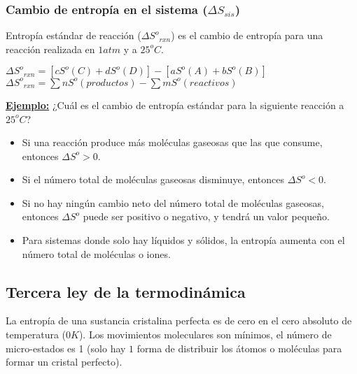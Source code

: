         \subsubsection{Cambio de entropía en el sistema ($\Delta S_{sis}$)}
        \sangria{} Entropía estándar de reacción ($\Delta {S^o}_{rxn}$) es el cambio de entropía para una reacción realizada en $1atm$ y a $25^oC$.
        \begin{center}
            $\Delta {S^o}_{rxn} = [cS^o(C) + dS^o(D)] - [aS^o(A) + bS^o(B)]$ \\[5pt]
            $\Delta {S^o}_{rxn} = \sum n S^o(productos) - \sum m S^o(reactivos)$
        \end{center}
        \textbf{\underline{Ejemplo:}} ¿Cuál es el cambio de entropía estándar para la siguiente reacción a $25^oC$? 
        
        \begin{itemize}
            \item Si una reacción produce más moléculas gaseosas que las que consume, entonces $\Delta S^o > 0$.
            \item Si el número total de moléculas gaseosas disminuye, entonces $\Delta S^o < 0$.
            \item Si no hay ningún cambio neto del número total de moléculas gaseosas, entonces $\Delta S^o$ puede ser positivo o negativo, y tendrá un valor pequeño.
            \item Para sistemas donde solo hay líquidos y sólidos, la entropía aumenta con el número total de moléculas o iones.
        \end{itemize}
        \saltoPag{}
    \subsection{Tercera ley de la termodinámica}
        \sangria{} La entropía de una sustancia cristalina perfecta es de cero en el cero absoluto de temperatura ($0 K$). Los movimientos moleculares son mínimos, el número de micro-estados es 1 (solo hay $1$ forma de distribuir los átomos o moléculas para formar un cristal perfecto).
